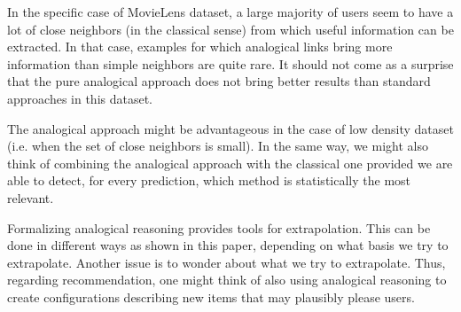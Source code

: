 \documentclass[conference]{IEEEtran}
\begin{document}
In the specific case of MovieLens dataset, a large majority of  users seem to have  a lot of close neighbors (in the classical sense)
from which
useful information can be extracted. In that case, examples for which analogical 
links bring more information than simple neighbors are quite rare.
It should not come as a surprise that the pure analogical approach does not bring better results
than standard approaches in this dataset.

The analogical approach  might be advantageous in the case of low density 
dataset (i.e. when the set of close neighbors is small).  In the same way, we might also think of combining
the analogical approach with the classical one provided we are able to detect, for every prediction, which method
is statistically the most relevant.

Formalizing analogical reasoning provides tools for extrapolation.  This can be
done in different ways as shown in this paper, depending on what basis we try
to extrapolate. Another issue is to wonder about what we try to extrapolate.
Thus, regarding recommendation, one might think of also using analogical
reasoning to create configurations describing new items that may plausibly
please users.



\end{document}
